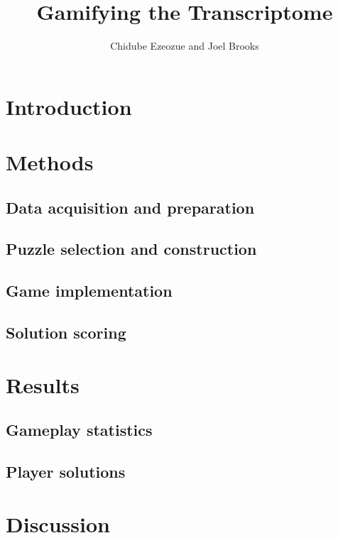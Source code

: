 \documentclass[12pt,twocolumn]{article}
\title{Gamifying the Transcriptome}
\author{Chidube Ezeozue and Joel Brooks}
\begin{document}

\renewcommand\refname{Bibliography}
\maketitle

\begin{abstract}

\end{abstract}

\section*{Introduction}

\section*{Methods}

\subsection*{Data acquisition and preparation}

\subsection*{Puzzle selection and construction}

\subsection*{Game implementation}

\subsection*{Solution scoring}

\section*{Results}

\subsection*{Gameplay statistics}

\subsection*{Player solutions}

\section*{Discussion}
\end{document}
